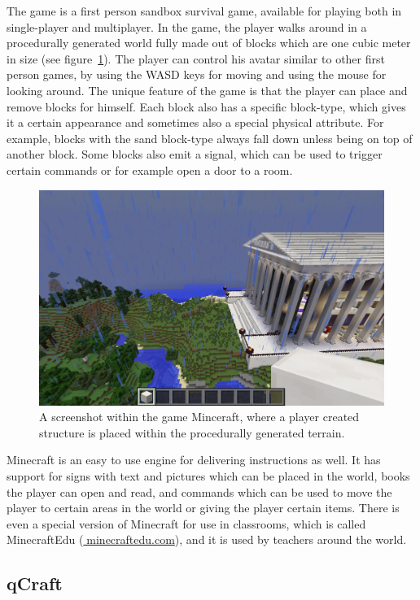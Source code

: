 \documentclass[11pt,twoside]{report} %
\begin{document}
The game is a first person sandbox survival game, available for playing both in single-player and multiplayer. In the game, the player walks around in a procedurally generated world fully made out of blocks which are one cubic meter in size (see figure~\ref{fig:screenshot}). The player can control his avatar similar to other first person games, by using the WASD keys for moving and using the mouse for looking around. The unique feature of the game is that the player can place and remove blocks for himself. Each block also has a specific block-type, which gives it a certain appearance and sometimes also a special physical attribute. For example, blocks with the sand block-type always fall down unless being on top of another block. Some blocks also emit a signal, which can be used to trigger certain commands or for example open a door to a room.

\begin{figure}[h]
\centering
\includegraphics[width=\textwidth]{screenshot}
\caption{A screenshot within the game Minceraft, where a player created structure is placed within the procedurally generated terrain.\label{fig:screenshot}}
\end{figure}

Minecraft is an easy to use engine for delivering instructions as well. It has support for signs with text and pictures which can be placed in the world, books the player can open and read, and commands which can be used to move the player to certain areas in the world or giving the player certain items. There is even a special version of Minecraft for use in classrooms, which is called MinecraftEdu (\url{minecraftedu.com}), and it is used by teachers around the world.

\subsection{qCraft}
\end{document}

